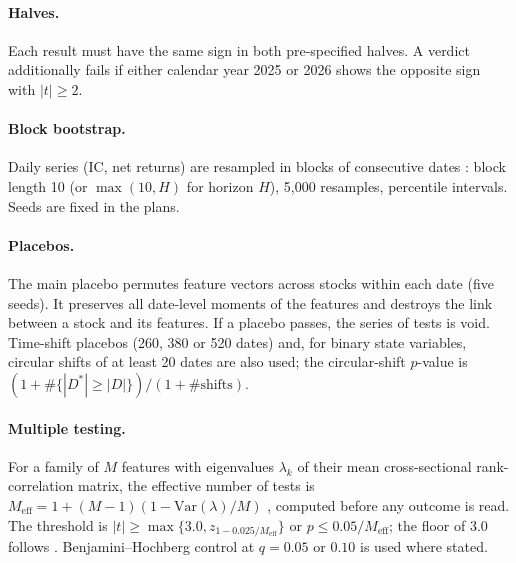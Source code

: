 \paragraph{Halves.} Each result must have the same sign in both pre-specified halves. A verdict additionally fails if either calendar year 2025 or 2026 shows the opposite sign with $|t|\ge 2$.

\paragraph{Block bootstrap.} Daily series (IC, net returns) are resampled in blocks of consecutive dates \citep{kunsch1989}: block length 10 (or $\max(10,H)$ for horizon $H$), 5,000 resamples, percentile intervals. Seeds are fixed in the plans.

\paragraph{Placebos.} The main placebo permutes feature vectors across stocks within each date (five seeds). It preserves all date-level moments of the features and destroys the link between a stock and its features. If a placebo passes, the series of tests is void. Time-shift placebos (260, 380 or 520 dates) and, for binary state variables, circular shifts of at least 20 dates are also used; the circular-shift $p$-value is $(1+\#\{|D^*|\ge|D|\})/(1+\#\text{shifts})$.

\paragraph{Multiple testing.} For a family of $M$ features with eigenvalues $\lambda_k$ of their mean cross-sectional rank-correlation matrix, the effective number of tests is $M_{\mathrm{eff}}=1+(M-1)(1-\mathrm{Var}(\lambda)/M)$ \citep{nyholt2004}, computed before any outcome is read. The threshold is $|t|\ge\max\{3.0,z_{1-0.025/M_{\mathrm{eff}}}\}$ or $p\le 0.05/M_{\mathrm{eff}}$; the floor of 3.0 follows \citet{harvey2016}. Benjamini--Hochberg control at $q=0.05$ or $0.10$ is used where stated.

